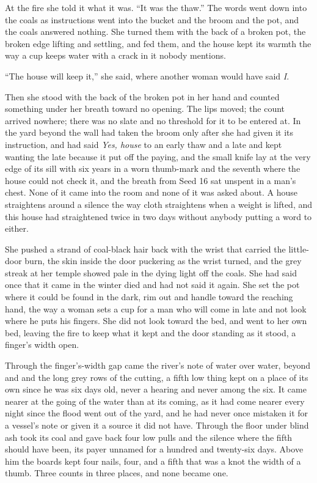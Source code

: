 At the fire she told it what it was. “It was the thaw.” The words went down into the coals as instructions went into the bucket and the broom and the pot, and the coals answered nothing. She turned them with the back of a broken pot, the broken edge lifting and settling, and fed them, and the house kept its warmth the way a cup keeps water with a crack in it nobody mentions.

“The house will keep it,” she said, where another woman would have said \emph{I}.

Then she stood with the back of the broken pot in her hand and counted something under her breath toward no opening. The lips moved; the count arrived nowhere; there was no slate and no threshold for it to be entered at. In the yard beyond the wall  had taken the broom only after she had given it its instruction, and had said \emph{Yes, house} to an early thaw and a late and kept wanting the late because it put off the paying, and the small knife lay at the very edge of its sill with six years in a worn thumb-mark and the seventh where the house could not check it, and the breath from Seed 16 sat unspent in a man's chest. None of it came into the room and none of it was asked about. A house straightens around a silence the way cloth straightens when a weight is lifted, and this house had straightened twice in two days without anybody putting a word to either.

She pushed a strand of coal-black hair back with the wrist that carried the little-door burn, the skin inside the door puckering as the wrist turned, and the grey streak at her temple showed pale in the dying light off the coals. She had said once that it came in the winter  died and had not said it again. She set the pot where it could be found in the dark, rim out and handle toward the reaching hand, the way a woman sets a cup for a man who will come in late and not look where he puts his fingers. She did not look toward the bed, and went to her own bed, leaving the fire to keep what it kept and the door standing as it stood, a finger's width open.

\scenebreak

Through the finger's-width gap came the river's note of water over water, beyond  and  and the long grey rows of the cutting, a fifth low thing kept on a place of its own since he was six days old, never a hearing and never among the six. It came nearer at the going of the water than at its coming, as it had come nearer every night since the flood went out of the yard, and he had never once mistaken it for a vessel's note or given it a source it did not have. Through the floor under blind ash  took its coal and gave back four low pulls and the silence where the fifth should have been, its payer unnamed for a hundred and twenty-six days. Above him the boards kept four nails, four, and a fifth that was a knot the width of a thumb. Three counts in three places, and none became one.

